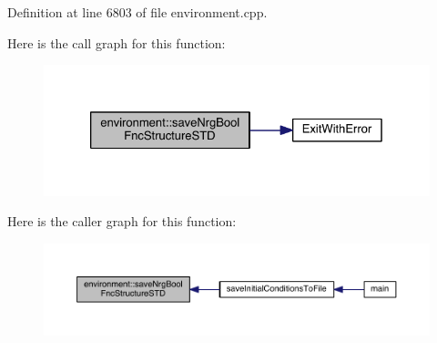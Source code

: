 Definition at line 6803 of file environment.\+cpp.



Here is the call graph for this function\+:\nopagebreak
\begin{figure}[H]
\begin{center}
\leavevmode
\includegraphics[width=326pt]{a00013_a1412b9b1c3bd3e42bcb481f5e18ea931_cgraph}
\end{center}
\end{figure}




Here is the caller graph for this function\+:\nopagebreak
\begin{figure}[H]
\begin{center}
\leavevmode
\includegraphics[width=350pt]{a00013_a1412b9b1c3bd3e42bcb481f5e18ea931_icgraph}
\end{center}
\end{figure}



